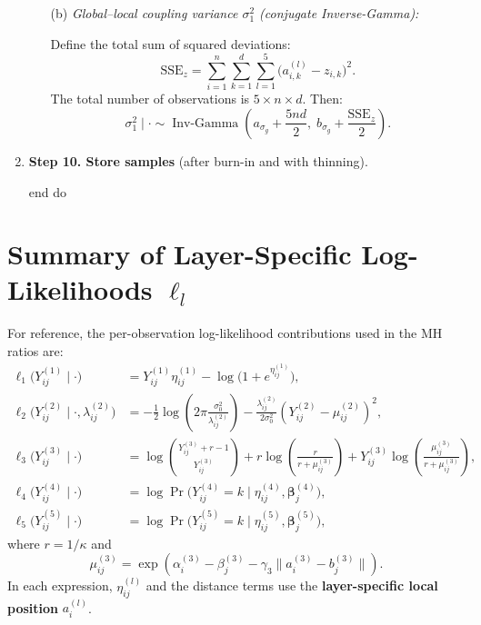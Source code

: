 \documentclass[11pt]{article}
\begin{document}
\begin{enumerate}[leftmargin=1.8em]
\begin{itemize}[leftmargin=1.5em]
        \item[(b)] \textit{Global--local coupling variance $\sigma_1^2$ (conjugate Inverse-Gamma):}

        Define the total sum of squared deviations:
        \[
        \text{SSE}_z = \sum_{i=1}^{n}\sum_{k=1}^{d}\sum_{l=1}^{5}\bigl(a_{i,k}^{(l)} - z_{i,k}\bigr)^2.
        \]
        The total number of observations is $5 \times n \times d$. Then:
        \[
        \sigma_1^2\mid \cdot
        \sim
        \operatorname{Inv\text{-}Gamma}
        \left(
        a_{\sigma_g} + \frac{5 n d}{2},\;
        b_{\sigma_g} + \frac{\text{SSE}_z}{2}
        \right).
        \]
    \end{itemize}

    \item \textbf{Step 10. Store samples} (after burn-in and with thinning).

    \item[end] do
\end{enumerate}

\section{Summary of Layer-Specific Log-Likelihoods $\ell_l$}

For reference, the per-observation log-likelihood contributions used in the MH ratios are:
\begin{align*}
\ell_1\bigl(Y_{ij}^{(1)}\mid \cdot\bigr)
&= Y_{ij}^{(1)}\eta_{ij}^{(1)} - \log\bigl(1+e^{\eta_{ij}^{(1)}}\bigr), \\
\ell_2\bigl(Y_{ij}^{(2)}\mid \cdot,\lambda_{ij}^{(2)}\bigr)
&= -\frac{1}{2}\log\left(2\pi \frac{\sigma_0^2}{\lambda_{ij}^{(2)}}\right)
-\frac{\lambda_{ij}^{(2)}}{2\sigma_0^2}\left(Y_{ij}^{(2)}-\mu_{ij}^{(2)}\right)^2, \\
\ell_3\bigl(Y_{ij}^{(3)}\mid \cdot\bigr)
&= \log\binom{Y_{ij}^{(3)}+r-1}{Y_{ij}^{(3)}}
+ r\log\left(\frac{r}{r+\mu_{ij}^{(3)}}\right)
+ Y_{ij}^{(3)}\log\left(\frac{\mu_{ij}^{(3)}}{r+\mu_{ij}^{(3)}}\right), \\
\ell_4\bigl(Y_{ij}^{(4)}\mid \cdot\bigr)
&= \log \Pr\bigl(Y_{ij}^{(4)}=k\mid \eta_{ij}^{(4)}, \bm{\beta}_j^{(4)}\bigr), \\
\ell_5\bigl(Y_{ij}^{(5)}\mid \cdot\bigr)
&= \log \Pr\bigl(Y_{ij}^{(5)}=k\mid \eta_{ij}^{(5)}, \bm{\beta}_j^{(5)}\bigr),
\end{align*}
where $r=1/\kappa$ and
\[
\mu_{ij}^{(3)} = \exp\left(\alpha_i^{(3)} - \beta_j^{(3)} - \gamma_3\|a_i^{(3)}-b_j^{(3)}\|\right).
\]
In each expression, $\eta_{ij}^{(l)}$ and the distance terms use the \textbf{layer-specific local position} $a_i^{(l)}$.
\end{document}
